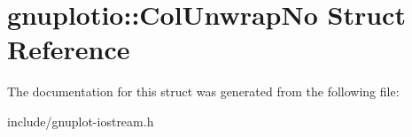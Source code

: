 \hypertarget{structgnuplotio_1_1ColUnwrapNo}{}\section{gnuplotio\+:\+:Col\+Unwrap\+No Struct Reference}
\label{structgnuplotio_1_1ColUnwrapNo}


The documentation for this struct was generated from the following file\+:\begin{DoxyCompactItemize}
\item 
include/gnuplot-\/iostream.\+h\end{DoxyCompactItemize}
